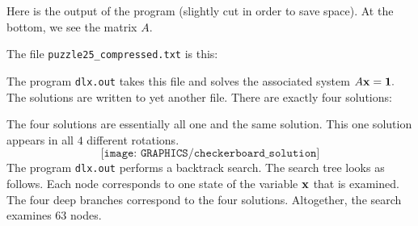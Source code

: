 {\small
{\tt

}
}

Here is the output of the program (slightly cut in order to save space). At the bottom, we see the matrix $A$.

{\scriptsize
{\tt

}
}

The file \verb'puzzle25_compressed.txt' is this:

{\scriptsize
{\tt

}
}

The program \verb'dlx.out' takes this file and solves the associated system $A {\bf x} = {\bf 1}.$ The solutions are written to 
yet another file. There are exactly four solutions:

{\tt

}
The four solutions are essentially all one and the same solution. 
This one solution appears in all $4$ different rotations.
$$
\texttt{[image: GRAPHICS/checkerboard\_solution]}
$$
The program \verb'dlx.out' performs a backtrack search. 
The search tree looks as follows. Each node corresponds to 
one state of the variable $\bx$ that is examined.
$$

$$
The four deep branches correspond to the four solutions.
Altogether, the search examines 63 nodes.

